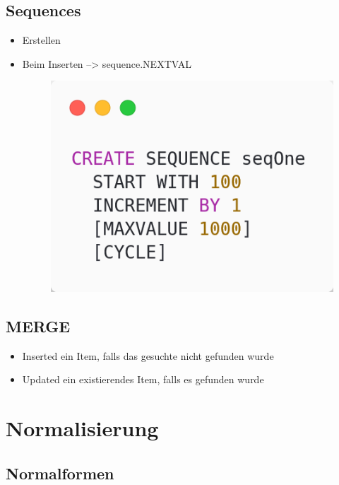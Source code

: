 \subsection{Sequences}
\begin{itemize}
    \item Erstellen
    \item Beim Inserten --> sequence.NEXTVAL
    \begin{figure}[H]
        \centering
        \includegraphics[scale=.3]{res/themenkorb_3/create_sequence.png}
    \end{figure}
\end{itemize}

\subsection{MERGE}
\begin{itemize}
    \item Inserted ein Item, falls das gesuchte nicht gefunden wurde
    \item Updated ein existierendes Item, falls es gefunden wurde
\end{itemize}

\section{Normalisierung}
\subsection{Normalformen}
